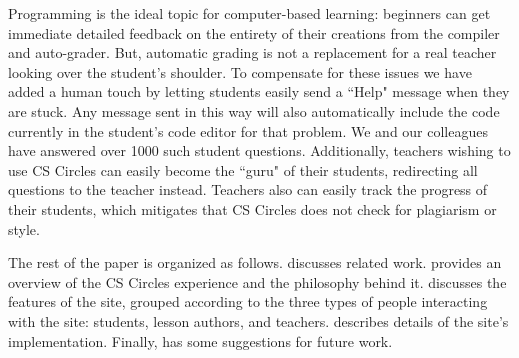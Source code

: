 \documentclass{article}
\begin{document}
Programming is the ideal topic for computer-based learning: beginners can get immediate detailed feedback on the entirety of their creations from the compiler and auto-grader. But, automatic grading is not a replacement for a real teacher looking over the student's shoulder. To compensate for these issues we have added a human touch by letting students easily send a ``Help" message when they are stuck. Any message sent in this way will also automatically include the code currently in the student's code editor for that problem. We and our colleagues have answered over 1000 such student questions. Additionally, teachers wishing to use CS Circles can easily become the ``guru" of their students, redirecting all questions to the teacher instead. Teachers also can easily track the progress of their students, which mitigates that CS Circles does not check for plagiarism or style.

The rest of the paper is organized as follows.  discusses related work.  provides an overview of the CS Circles experience and the philosophy behind it.  discusses the features of the site, grouped according to the three types of people interacting with the site: students, lesson authors, and teachers.  describes details of the site's implementation. Finally,  has some suggestions for future work.
\end{document}
